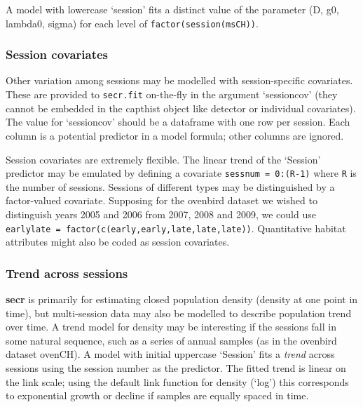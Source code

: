 \documentclass[
]{book}
\begin{document}
A model with lowercase `session' fits a distinct value of the parameter (D, g0, lambda0, sigma) for each level of \texttt{factor(session(msCH))}.

\subsubsection{Session covariates}\label{session-covariates}

Other variation among sessions may be modelled with session-specific covariates. These are provided to \texttt{secr.fit} on-the-fly in the argument `sessioncov' (they cannot be embedded in the capthist object like detector or individual covariates). The value for `sessioncov' should be a dataframe with one row per session. Each column is a potential predictor in a model formula; other columns are ignored.

Session covariates are extremely flexible. The linear trend of the `Session' predictor may be emulated by defining a covariate \texttt{sessnum\ =\ 0:(R-1)} where \texttt{R} is the number of sessions. Sessions of different types may be distinguished by a factor-valued covariate. Supposing for the ovenbird dataset we wished to distinguish years 2005 and 2006 from 2007, 2008 and 2009, we could use \texttt{earlylate\ =\ factor(c(\textquotesingle{}early\textquotesingle{},\textquotesingle{}early\textquotesingle{},\textquotesingle{}late\textquotesingle{},\textquotesingle{}late\textquotesingle{},\textquotesingle{}late\textquotesingle{}))}. Quantitative habitat attributes might also be coded as session covariates.

\subsubsection{Trend across sessions}\label{simpletrend}


\textbf{secr} is primarily for estimating closed population density (density at one point in time), but multi-session data may also be modelled to describe population trend over time. A trend model for density may be interesting if the sessions fall in some natural sequence, such as a series of annual samples (as in the ovenbird dataset ovenCH). A model with initial uppercase `Session' fits a \emph{trend} across sessions using the session number as the predictor. The fitted trend is linear on the link scale; using the default link function for density (`log') this corresponds to exponential growth or decline if samples are equally spaced in time.
\end{document}
